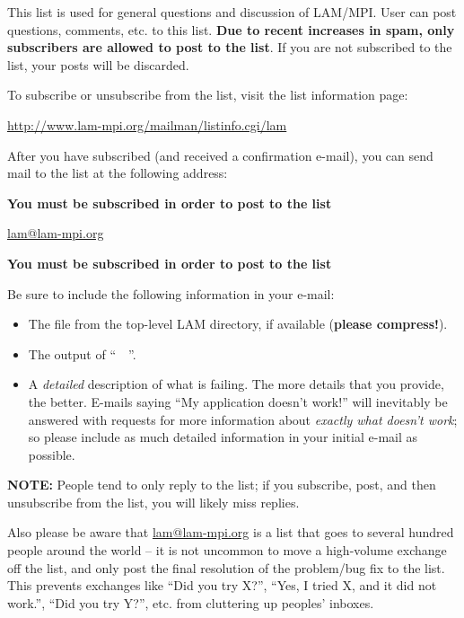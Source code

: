\vspace{11pt}
  
This list is used for general questions and discussion of LAM/MPI.
User can post questions, comments, etc. to this list.  {\bf Due to
  recent increases in spam, only subscribers are allowed to post to
  the list}.  If you are not subscribed to the list, your posts will
be discarded.

To subscribe or unsubscribe from the list, visit the list information
page:

\vspace{11pt}
\centerline{\url{http://www.lam-mpi.org/mailman/listinfo.cgi/lam}}
\vspace{11pt}
  
After you have subscribed (and received a confirmation e-mail), you
can send mail to the list at the following address:
  
\vspace{11pt}
\centerline{{\bf You must be subscribed in order to post to the list}}
\centerline{\url{lam@lam-mpi.org}}
\centerline{{\bf You must be subscribed in order to post to the list}}
\vspace{11pt}
  
Be sure to include the following information in your e-mail:

\begin{itemize}
\item The  file from the top-level LAM directory, if
  available ({\bf please compress!}).
  
\item The output of ``\ \ ''.

\item A {\em detailed} description of what is failing.  The more
  details that you provide, the better.  E-mails saying ``My
  application doesn't work!'' will inevitably be answered with
  requests for more information about {\em exactly what doesn't work};
  so please include as much detailed information in your initial
  e-mail as possible.
\end{itemize}
  
{\bf NOTE:} People tend to only reply to the list; if you subscribe,
post, and then unsubscribe from the list, you will likely miss
replies.
  
Also please be aware that \url{lam@lam-mpi.org} is a list that goes to
several hundred people around the world -- it is not uncommon to move
a high-volume exchange off the list, and only post the final
resolution of the problem/bug fix to the list.  This prevents
exchanges like ``Did you try X?'', ``Yes, I tried X, and it did not
work.'', ``Did you try Y?'', etc. from cluttering up peoples' inboxes.

